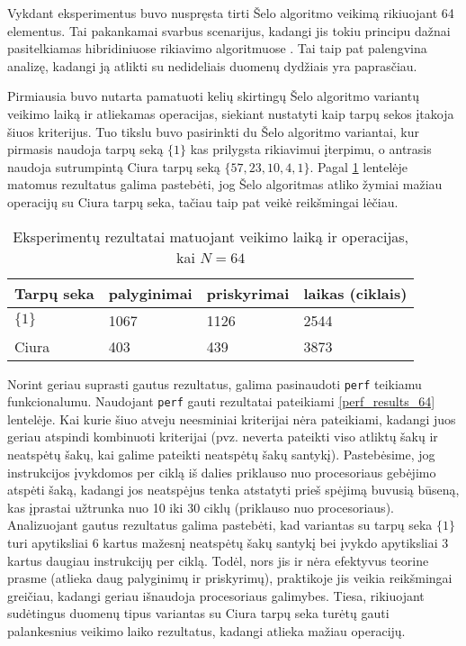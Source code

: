 \documentclass{VUMIFInfBakalaurinis}
\begin{document}
Vykdant eksperimentus buvo nuspręsta tirti Šelo algoritmo veikimą rikiuojant 64 elementus.
Tai pakankamai svarbus scenarijus, kadangi jis tokiu principu dažnai pasitelkiamas hibridiniuose rikiavimo algoritmuose \cite{golangsort,bzip2sort}.
Tai taip pat palengvina analizę, kadangi ją atlikti su nedideliais duomenų dydžiais yra paprasčiau.

Pirmiausia buvo nutarta pamatuoti kelių skirtingų Šelo algoritmo variantų veikimo laiką ir atliekamas operacijas, siekiant nustatyti kaip tarpų sekos įtakoja šiuos kriterijus.
Tuo tikslu buvo pasirinkti du Šelo algoritmo variantai, kur pirmasis naudoja tarpų seką $\{1\}$ kas prilygsta rikiavimui įterpimu, o antrasis naudoja sutrumpintą Ciura tarpų seką $\{57,23,10,4,1\}$.
Pagal \ref{experiment_results_64} lentelėje matomus rezultatus galima pastebėti, jog
Šelo algoritmas atliko žymiai mažiau operacijų su Ciura tarpų seka, tačiau taip pat veikė reikšmingai lėčiau.

\begin{table}[H]
  \caption{Eksperimentų rezultatai matuojant veikimo laiką ir operacijas, kai $N = 64$}
  \label{experiment_results_64}
  \centering
  \begin{tabular}{@{}llll@{}}
  Tarpų seka            & palyginimai       & priskyrimai      & laikas (ciklais) \\ \midrule
  $\{1\}$               & 1067              & 1126             & 2544                  \\
  Ciura                 & 403               & 439              & 3873                  \\ \bottomrule
  \end{tabular}
\end{table}

Norint geriau suprasti gautus rezultatus, galima pasinaudoti \verb|perf| teikiamu funkcionalumu.
Naudojant \verb|perf| gauti rezultatai pateikiami \ref{perf_results_64} lentelėje.
Kai kurie šiuo atveju neesminiai kriterijai nėra pateikiami, kadangi juos geriau atspindi kombinuoti kriterijai
(pvz. neverta pateikti viso atliktų šakų ir neatspėtų šakų, kai galime pateikti neatspėtų šakų santykį).
Pastebėsime, jog instrukcijos įvykdomos per ciklą iš dalies priklauso nuo procesoriaus gebėjimo atspėti šaką, kadangi jos neatspėjus tenka atstatyti prieš spėjimą buvusią būseną,
kas įprastai užtrunka nuo 10 iki 30 ciklų (priklauso nuo procesoriaus).
Analizuojant gautus rezultatus galima pastebėti, kad variantas su tarpų seka $\{1\}$ turi apytiksliai 6 kartus mažesnį neatspėtų šakų santykį bei įvykdo apytiksliai 3 kartus daugiau instrukcijų per ciklą.
Todėl, nors jis ir nėra efektyvus teorine prasme (atlieka daug palyginimų ir priskyrimų), praktikoje jis veikia reikšmingai greičiau, kadangi geriau išnaudoja procesoriaus galimybes.
Tiesa, rikiuojant sudėtingus duomenų tipus variantas su Ciura tarpų seka turėtų gauti palankesnius veikimo laiko rezultatus, kadangi atlieka mažiau operacijų.
\end{document}
